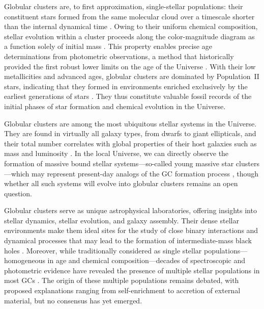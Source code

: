     Globular clusters are, to first approximation, single-stellar populations: their constituent stars formed from the same molecular cloud over a timescale shorter than the internal dynamical time \citep{1988ApJ...324..288A,2009MNRAS.397..954F,2014PhR...539...49K}. Owing to their uniform chemical composition, stellar evolution within a cluster proceeds along the color-magnitude diagram as a function solely of initial mass \citep{2013sse..book.....K}. This property enables precise age determinations from photometric observations, a method that historically provided the first robust lower limits on the age of the Universe \citep{1959MNRAS.119..124H,1985A&A...147..169G,1992ApJ...400..265M}. With their low metallicities and advanced ages, globular clusters are dominated by Population~II stars, indicating that they formed in environments enriched exclusively by the earliest generations of stars \citep{2022A&A...668A.191C}. They thus constitute valuable fossil records of the initial phases of star formation and chemical evolution in the Universe.
    
    Globular clusters are among the most ubiquitous stellar systems in the Universe. They are found in virtually all galaxy types, from dwarfs to giant ellipticals, and their total number correlates with global properties of their host galaxies such as mass and luminosity \citep[e.g.,][]{2013ApJ...772...82H,2018MNRAS.481.5592F}. In the local Universe, we can directly observe the formation of massive bound stellar systems—so-called young massive star clusters—which may represent present-day analogs of the GC formation process \citep[e.g.,][]{2010ARA&A..48..431P,2020SSRv..216...69A}, though whether all such systems will evolve into globular clusters remains an open question.

    Globular clusters serve as unique astrophysical laboratories, offering insights into stellar dynamics, stellar evolution, and galaxy assembly. Their dense stellar environments make them ideal sites for the study of close binary interactions and dynamical processes that may lead to the formation of intermediate-mass black holes \citep{2013MNRAS.432.2779B,2015MNRAS.454.3150G,2018ARA&A..56...83B}. Moreover, while traditionally considered as single stellar populations—homogeneous in age and chemical composition—decades of spectroscopic and photometric evidence have revealed the presence of multiple stellar populations in most GCs \citep{2008MNRAS.391..825D,2012A&ARv..20...50G}. The origin of these multiple populations remains debated, with proposed explanations ranging from self-enrichment to accretion of external material, but no consensus has yet emerged.

